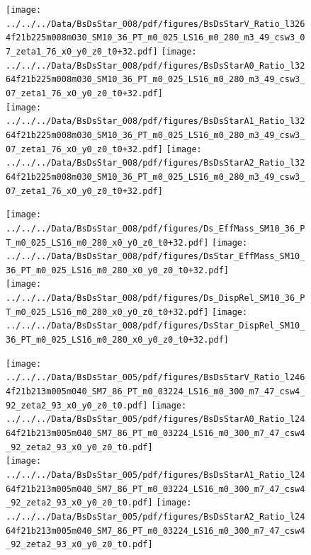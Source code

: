 \documentclass[a4paper,10pt]{article}
\begin{document}
\begin{figure}[p]
 \texttt{[image: ../../../Data/BsDsStar\_008/pdf/figures/BsDsStarV\_Ratio\_l3264f21b225m008m030\_SM10\_36\_PT\_m0\_025\_LS16\_m0\_280\_m3\_49\_csw3\_07\_zeta1\_76\_x0\_y0\_z0\_t0+32.pdf]}  
\texttt{[image: ../../../Data/BsDsStar\_008/pdf/figures/BsDsStarA0\_Ratio\_l3264f21b225m008m030\_SM10\_36\_PT\_m0\_025\_LS16\_m0\_280\_m3\_49\_csw3\_07\_zeta1\_76\_x0\_y0\_z0\_t0+32.pdf]} \\ 
\texttt{[image: ../../../Data/BsDsStar\_008/pdf/figures/BsDsStarA1\_Ratio\_l3264f21b225m008m030\_SM10\_36\_PT\_m0\_025\_LS16\_m0\_280\_m3\_49\_csw3\_07\_zeta1\_76\_x0\_y0\_z0\_t0+32.pdf]}  
\texttt{[image: ../../../Data/BsDsStar\_008/pdf/figures/BsDsStarA2\_Ratio\_l3264f21b225m008m030\_SM10\_36\_PT\_m0\_025\_LS16\_m0\_280\_m3\_49\_csw3\_07\_zeta1\_76\_x0\_y0\_z0\_t0+32.pdf]} \\ 
\end{figure} 
\clearpage

\begin{figure}[p]
 \texttt{[image: ../../../Data/BsDsStar\_008/pdf/figures/Ds\_EffMass\_SM10\_36\_PT\_m0\_025\_LS16\_m0\_280\_x0\_y0\_z0\_t0+32.pdf]}  
\texttt{[image: ../../../Data/BsDsStar\_008/pdf/figures/DsStar\_EffMass\_SM10\_36\_PT\_m0\_025\_LS16\_m0\_280\_x0\_y0\_z0\_t0+32.pdf]} \\ 
\texttt{[image: ../../../Data/BsDsStar\_008/pdf/figures/Ds\_DispRel\_SM10\_36\_PT\_m0\_025\_LS16\_m0\_280\_x0\_y0\_z0\_t0+32.pdf]}  
\texttt{[image: ../../../Data/BsDsStar\_008/pdf/figures/DsStar\_DispRel\_SM10\_36\_PT\_m0\_025\_LS16\_m0\_280\_x0\_y0\_z0\_t0+32.pdf]} \\ 
\end{figure} 
\clearpage

\begin{figure}[p]
 \texttt{[image: ../../../Data/BsDsStar\_005/pdf/figures/BsDsStarV\_Ratio\_l2464f21b213m005m040\_SM7\_86\_PT\_m0\_03224\_LS16\_m0\_300\_m7\_47\_csw4\_92\_zeta2\_93\_x0\_y0\_z0\_t0.pdf]}  
\texttt{[image: ../../../Data/BsDsStar\_005/pdf/figures/BsDsStarA0\_Ratio\_l2464f21b213m005m040\_SM7\_86\_PT\_m0\_03224\_LS16\_m0\_300\_m7\_47\_csw4\_92\_zeta2\_93\_x0\_y0\_z0\_t0.pdf]} \\ 
\texttt{[image: ../../../Data/BsDsStar\_005/pdf/figures/BsDsStarA1\_Ratio\_l2464f21b213m005m040\_SM7\_86\_PT\_m0\_03224\_LS16\_m0\_300\_m7\_47\_csw4\_92\_zeta2\_93\_x0\_y0\_z0\_t0.pdf]}  
\texttt{[image: ../../../Data/BsDsStar\_005/pdf/figures/BsDsStarA2\_Ratio\_l2464f21b213m005m040\_SM7\_86\_PT\_m0\_03224\_LS16\_m0\_300\_m7\_47\_csw4\_92\_zeta2\_93\_x0\_y0\_z0\_t0.pdf]} \\ 
\end{figure} 
\clearpage
\end{document}
